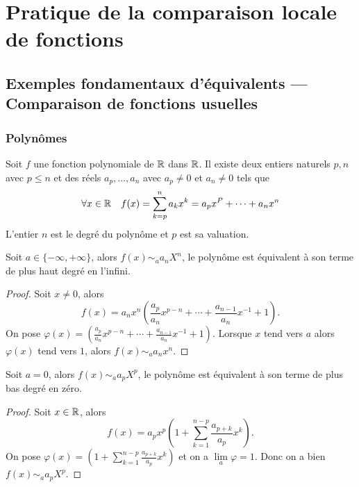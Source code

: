 \section{Pratique de la comparaison locale de fonctions}

\subsection{Exemples fondamentaux d'équivalents --- Comparaison de fonctions
usuelles}

\subsubsection{Polynômes}
Soit \(f\) une fonction polynomiale de \(\mathbb{R}\) dans \(\mathbb{R}\). Il existe deux
entiers naturels \(p, n\) avec \(p \leqslant n\) et des réels \(a_p, \ldots,
a_n\) avec \(a_p \neq 0\) et \(a_n \neq 0\) tels que
\begin{equation}
  \forall x \in \mathbb{R} \quad f(x)=\sum_{k=p}^{n} a_k x^k = a_p x^P + \dotsb + a_n
  x^n
\end{equation}
L'entier \(n\) est le degré du polynôme et \(p\) est sa valuation.
\begin{prop}
  Soit \(a \in \{-\infty, +\infty\}\), alors \(f(x) \sim_a a_n X^n\), le
  polynôme est équivalent à son terme de plus haut degré en l'infini.
\end{prop}
\begin{proof}
  Soit \(x \neq 0\), alors
  \begin{equation}
    f(x)=a_n x^n \left( \frac{a_p}{a_n} x^{p-n} + \dotsb + \frac{a_{n-1}}{a_n}
    x^{-1} + 1\right).
  \end{equation}
  On pose \(\varphi(x) = \left( \frac{a_p}{a_n} x^{p-n} + \dotsb +
  \frac{a_{n-1}}{a_n} x^{-1} + 1\right)\). Lorsque \(x\) tend vers \(a\) alors
  \(\varphi(x)\) tend vers \(1\), alors \(f(x) \sim_a a_n x^n\).
\end{proof}
\begin{prop}
  Soit \(a=0\), alors \(f(x) \sim_a a_p X^p\), le polynôme est équivalent à son
  terme de plus bas degré en zéro.
\end{prop}
\begin{proof}
  Soit \(x \in \mathbb{R}\), alors
  \begin{equation}
    f(x) = a_p x^p \left(1+ \sum_{k=1}^{n-p} \frac{a_{p+k}}{a_p} x^k\right).
  \end{equation}
  On pose \(\varphi(x)=\left(1+ \sum_{k=1}^{n-p} \frac{a_{p+k}}{a_p}
  x^k\right)\) et on a \(\lim\limits_{a} \varphi = 1\). Donc on a bien \(f(x)
  \sim_a a_p X^p\).
\end{proof}


